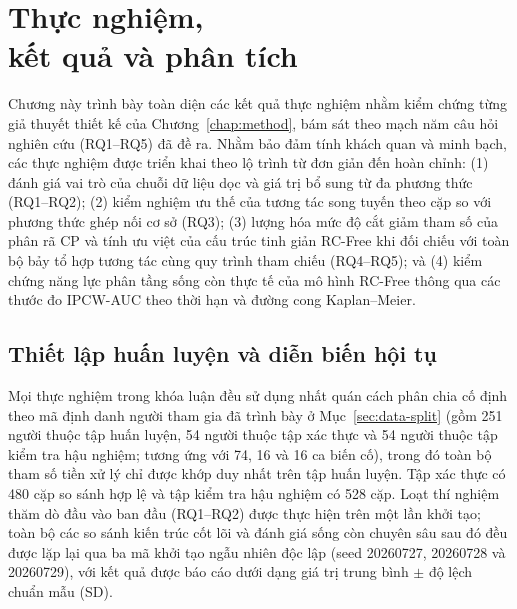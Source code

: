 \chapter[Thực nghiệm, kết quả và phân tích]{Thực nghiệm,\\kết quả và phân tích}
\label{chap:results}

Chương này trình bày toàn diện các kết quả thực nghiệm nhằm kiểm chứng từng giả thuyết thiết kế của Chương~\ref{chap:method}, bám sát theo mạch năm câu hỏi nghiên cứu (RQ1--RQ5) đã đề ra. Nhằm bảo đảm tính khách quan và minh bạch, các thực nghiệm được triển khai theo lộ trình từ đơn giản đến hoàn chỉnh: (1) đánh giá vai trò của chuỗi dữ liệu dọc và giá trị bổ sung từ đa phương thức (RQ1--RQ2); (2) kiểm nghiệm ưu thế của tương tác song tuyến theo cặp so với phương thức ghép nối cơ sở (RQ3); (3) lượng hóa mức độ cắt giảm tham số của phân rã CP và tính ưu việt của cấu trúc tinh giản RC-Free khi đối chiếu với toàn bộ bảy tổ hợp tương tác cùng quy trình tham chiếu (RQ4--RQ5); và (4) kiểm chứng năng lực phân tầng sống còn thực tế của mô hình RC-Free thông qua các thước đo IPCW-AUC theo thời hạn và đường cong Kaplan--Meier.

\section{Thiết lập huấn luyện và diễn biến hội tụ}
\label{sec:experimental-protocol}
Mọi thực nghiệm trong khóa luận đều sử dụng nhất quán cách phân chia cố định theo mã định danh người tham gia đã trình bày ở Mục~\ref{sec:data-split} (gồm 251 người thuộc tập huấn luyện, 54 người thuộc tập xác thực và 54 người thuộc tập kiểm tra hậu nghiệm; tương ứng với 74, 16 và 16 ca biến cố), trong đó toàn bộ tham số tiền xử lý chỉ được khớp duy nhất trên tập huấn luyện. Tập xác thực có 480 cặp so sánh hợp lệ và tập kiểm tra hậu nghiệm có 528 cặp. Loạt thí nghiệm thăm dò đầu vào ban đầu (RQ1--RQ2) được thực hiện trên một lần khởi tạo; toàn bộ các so sánh kiến trúc cốt lõi và đánh giá sống còn chuyên sâu sau đó đều được lặp lại qua ba mã khởi tạo ngẫu nhiên độc lập (seed 20260727, 20260728 và 20260729), với kết quả được báo cáo dưới dạng giá trị trung bình $\pm$ độ lệch chuẩn mẫu (SD).

